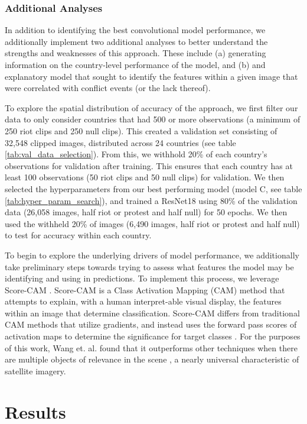 \subsubsection{Additional Analyses} \label{sec:validation_methods}
In addition to identifying the best convolutional model performance, we additionally implement two additional analyses to better understand the strengths and weaknesses of this approach.  These include (a) generating information on the country-level performance of the model, and (b) and explanatory model that sought to identify the features within a given image that were correlated with conflict events (or the lack thereof).  
\par
To explore the spatial distribution of accuracy of the approach, we first filter our data to only consider countries that had 500 or more observations (a minimum of 250 riot clips and 250 null clips).  This created a validation set consisting of 32,548 clipped images, distributed across 24 countries (see table \ref{tab:val_data_selection}). From this, we withhold 20\% of each country's observations for validation after training.  This ensures that each country has at least 100 observations (50 riot clips and 50 null clips) for validation.  We then selected the hyperparameters from our best performing model (model C, see table \ref{tab:hyper_param_search}), and trained a ResNet18 using 80\% of the validation data (26,058 images, half riot or protest and half null) for 50 epochs.  We then used the withheld 20\% of images (6,490 images, half riot or protest and half null) to test for accuracy within each country.

To begin to explore the underlying drivers of model performance, we additionally take preliminary steps towards trying to assess what features the model may be identifying and using in predictions.  To implement this process, we leverage Score-CAM \citep{wang2020score}.  Score-CAM is a Class Activation Mapping (CAM) method that attempts to explain, with a human interpret-able visual display, the features within an image that determine classification.  Score-CAM differs from traditional CAM methods that utilize gradients, and instead uses the forward pass scores of activation maps to determine the significance for target classes \citep{wang2020score}.  For the purposes of this work, Wang et. al. found that it outperforms other techniques when there are multiple objects of relevance in the scene \citep{wang2020score}, a nearly universal characteristic of satellite imagery.  

\section{Results}

